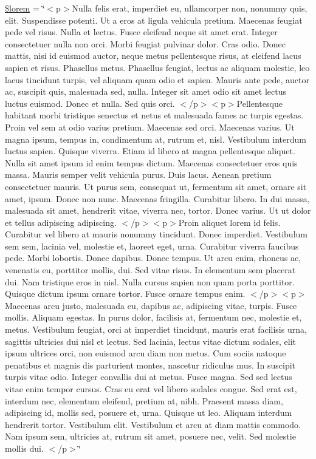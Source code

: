 \begin{DoxyCompactItemize}
\hyperlink{example14__page__numbers___to_c___index___bookmarks_8php_a3742c205662e0144915e8279eb178216}{\$lorem} = \char`\"{}$<$p$>$Nulla felis erat, imperdiet eu, ullamcorper non, nonummy quis, elit. Suspendisse potenti. Ut a eros at ligula vehicula pretium. Maecenas feugiat pede vel risus. Nulla et lectus. Fusce eleifend neque sit amet erat. Integer consectetuer nulla non orci. Morbi feugiat pulvinar dolor. Cras odio. Donec mattis, nisi id euismod auctor, neque metus pellentesque risus, at eleifend lacus sapien et risus. Phasellus metus. Phasellus feugiat, lectus ac aliquam molestie, leo lacus tincidunt turpis, vel aliquam quam odio et sapien. Mauris ante pede, auctor ac, suscipit quis, malesuada sed, nulla. Integer sit amet odio sit amet lectus luctus euismod. Donec et nulla. Sed quis orci. $<$/p$>$$<$p$>$Pellentesque habitant morbi tristique senectus et netus et malesuada fames ac turpis egestas. Proin vel sem at odio varius pretium. Maecenas sed orci. Maecenas varius. Ut magna ipsum, tempus in, condimentum at, rutrum et, nisl. Vestibulum interdum luctus sapien. Quisque viverra. Etiam id libero at magna pellentesque aliquet. Nulla sit amet ipsum id enim tempus dictum. Maecenas consectetuer eros quis massa. Mauris semper velit vehicula purus. Duis lacus. Aenean pretium consectetuer mauris. Ut purus sem, consequat ut, fermentum sit amet, ornare sit amet, ipsum. Donec non nunc. Maecenas fringilla. Curabitur libero. In dui massa, malesuada sit amet, hendrerit vitae, viverra nec, tortor. Donec varius. Ut ut dolor et tellus adipiscing adipiscing. $<$/p$>$$<$p$>$Proin aliquet lorem id felis. Curabitur vel libero at mauris nonummy tincidunt. Donec imperdiet. Vestibulum sem sem, lacinia vel, molestie et, laoreet eget, urna. Curabitur viverra faucibus pede. Morbi lobortis. Donec dapibus. Donec tempus. Ut arcu enim, rhoncus ac, venenatis eu, porttitor mollis, dui. Sed vitae risus. In elementum sem placerat dui. Nam tristique eros in nisl. Nulla cursus sapien non quam porta porttitor. Quisque dictum ipsum ornare tortor. Fusce ornare tempus enim. $<$/p$>$$<$p$>$Maecenas arcu justo, malesuada eu, dapibus ac, adipiscing vitae, turpis. Fusce mollis. Aliquam egestas. In purus dolor, facilisis at, fermentum nec, molestie et, metus. Vestibulum feugiat, orci at imperdiet tincidunt, mauris erat facilisis urna, sagittis ultricies dui nisl et lectus. Sed lacinia, lectus vitae dictum sodales, elit ipsum ultrices orci, non euismod arcu diam non metus. Cum sociis natoque penatibus et magnis dis parturient montes, nascetur ridiculus mus. In suscipit turpis vitae odio. Integer convallis dui at metus. Fusce magna. Sed sed lectus vitae enim tempor cursus. Cras eu erat vel libero sodales congue. Sed erat est, interdum nec, elementum eleifend, pretium at, nibh. Praesent massa diam, adipiscing id, mollis sed, posuere et, urna. Quisque ut leo. Aliquam interdum hendrerit tortor. Vestibulum elit. Vestibulum et arcu at diam mattis commodo. Nam ipsum sem, ultricies at, rutrum sit amet, posuere nec, velit. Sed molestie mollis dui. $<$/p$>$\char`\"{}
$$
\end{DoxyCompactItemize}
